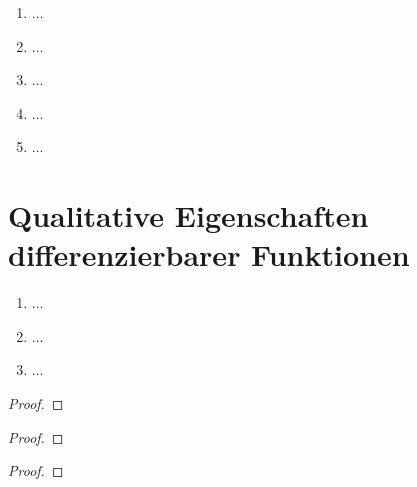 \documentclass[12pt]{scrreprt}
\begin{document}
\begin{bsp}\label{}
\begin{enumerate}
\item ...
\item ...
\item ...
\item ...
\item ...
\end{enumerate}
\end{bsp}

\begin{bsp}\label{}

\end{bsp}

\begin{dfn}\label{}

\end{dfn}
\begin{bem*}

\end{bem*}

\section{Qualitative Eigenschaften differenzierbarer Funktionen}
\label{}

\begin{dfn}\label{}

\end{dfn}

\begin{satz}\label{}
\begin{enumerate}
\item ...
\item ...
\item ...
\end{enumerate}
\end{satz}
\begin{proof}

\end{proof}
\begin{bem*}

\end{bem*}
\begin{bsp*}

\end{bsp*}
\begin{proof}

\end{proof}

\begin{thm}\label{}

\end{thm}
\begin{proof}

\end{proof}
\end{document}

